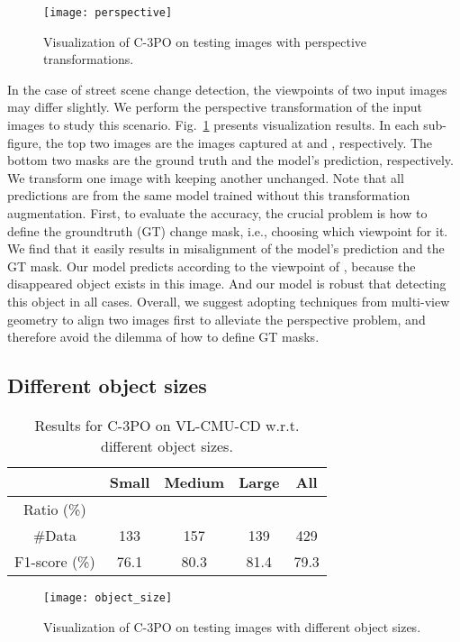 \documentclass[review]{elsarticle}
\begin{document}
\begin{figure}
	\centering
	\texttt{[image: perspective]}
	\caption{Visualization of C-3PO on testing images with perspective transformations.}
	\label{fig:perspective}
\end{figure}

In the case of street scene change detection, the viewpoints of two input images may differ slightly. We perform the perspective transformation of the input images to study this scenario. Fig.~\ref{fig:perspective} presents visualization results. In each sub-figure, the top two images are the images captured at  and , respectively. The bottom two masks are the ground truth and the model's prediction, respectively. We transform one image with keeping another unchanged. Note that all predictions are from the same model trained without this transformation augmentation. First, to evaluate the accuracy, the crucial problem is how to define the groundtruth (GT) change mask, i.e., choosing which viewpoint for it. We find that it easily results in misalignment of the model's prediction and the GT mask. Our model predicts according to the viewpoint of , because the disappeared object exists in this image. And our model is robust that detecting this object in all cases. Overall, we suggest adopting techniques from multi-view geometry to align two images first to alleviate the perspective problem, and therefore avoid the dilemma of how to define GT masks.

\subsection{Different object sizes}
\label{sec:size}

\begin{table}
  \centering
  \small
  \caption{Results for C-3PO on VL-CMU-CD w.r.t. different object sizes.}
  \begin{tabular}{c|ccc|c}
    \hline
     & {Small} & {Medium} & {Large} & {All} \\
    \hline
    Ratio (\%) &  &  &  & \\
    \#Data & 133 & 157 & 139 & 429 \\
    \hline
    F1-score (\%) & 76.1 & 80.3 & 81.4 & 79.3 \\
    \hline
  \end{tabular}
  \label{tab:size}
\end{table}

\begin{figure}
	\centering
	\texttt{[image: object\_size]}
	\caption{Visualization of C-3PO on testing images with different object sizes. }
	\label{fig:object_size}
\end{figure}
\end{document}
